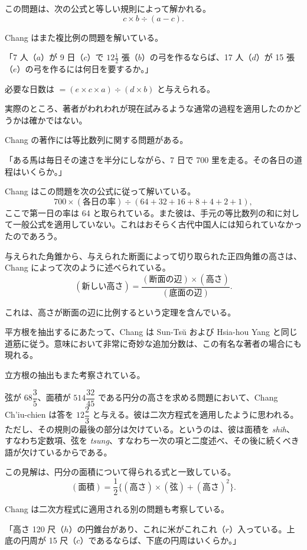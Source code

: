 \documentclass[11pt]{article}
\newcommand{\scanpage}[2]{\clearpage\setcounter{footnote}{0}\noindent{\footnotesize\color{gray}PDF #1 頁 · #2}\par\medskip}
\newcommand{\scanfooter}{}
\begin{document}
この問題は、次の公式と等しい規則によって解かれる。
\[
c\times b\div(a-c).
\]

Chang はまた複比例の問題を解いている。

「7 人（$a$）が 9 日（$c$）で $12\frac{1}{2}$ 張（$b$）の弓を作るならば、17 人（$d$）が 15 張（$e$）の弓を作るには何日を要するか。」
\scanfooter

\scanpage{0056}{第一部、印刷頁42}

必要な日数は $=(e\times c\times a)\div(d\times b)$ と与えられる。

実際のところ、著者がわれわれが現在試みるような通常の過程を適用したのかどうかは確かではない。

Chang の著作には等比数列に関する問題がある。

「ある馬は毎日その速さを半分にしながら、7 日で 700 里を走る。その各日の道程はいくらか。」

Chang はこの問題を次の公式に従って解いている。
\[
700\times(\text{各日の率})\div(64+32+16+8+4+2+1),
\]
ここで第一日の率は 64 と取られている。また彼は、手元の等比数列の和に対して一般公式を適用していない。これはおそらく古代中国人には知られていなかったのであろう。

与えられた角錐から、与えられた断面によって切り取られた正四角錐の高さは、Chang によって次のように述べられている。
\[
(\text{新しい高さ})=\frac{(\text{断面の辺})\times(\text{高さ})}{(\text{底面の辺})}.
\]

これは、高さが断面の辺に比例するという定理を含んでいる。

平方根を抽出するにあたって、Chang は Sun-Tsŭ および Hsia-hou Yang と同じ道筋に従う。意味において非常に奇妙な追加分数は、この有名な著者の場合にも現れる。

立方根の抽出もまた考察されている。

弦が $68\dfrac{3}{5}$、面積が $514\dfrac{32}{45}$ である円分の高さを求める問題において、Chang Ch'iu-chien は答を $12\dfrac{2}{3}$ と与える。彼は二次方程式を適用したように思われる。ただし、その規則の最後の部分は欠けている。というのは、彼は面積を \emph{shih}、すなわち定数項、弦を \emph{tsung}、すなわち一次の項と二度述べ、その後に続くべき語が欠けているからである。

この見解は、円分の面積について得られる式と一致している。
\[
(\text{面積})=\frac{1}{2}\{(\text{高さ})\times(\text{弦})+(\text{高さ})^2\}.
\]

Chang は二次方程式に適用される別の問題も考察している。

「高さ 120 尺（$h$）の円錐台があり、これに米がこれこれ（$r$）入っている。上底の円周が 15 尺（$c$）であるならば、下底の円周はいくらか。」
\scanfooter
\end{document}
